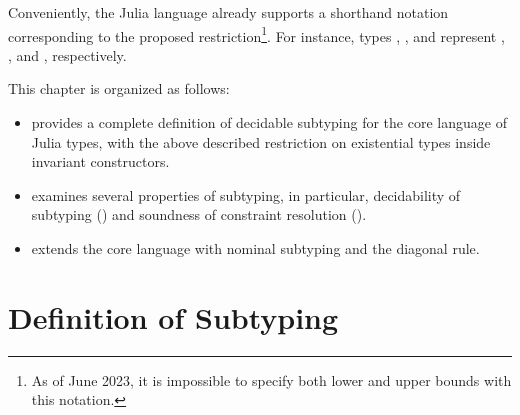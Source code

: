 Conveniently, the Julia language already supports a shorthand notation
corresponding to the proposed restriction\footnote{As of June 2023,
it is impossible to specify both lower and upper bounds with this notation.}.
For instance, types , , and 
represent , ,
and , respectively.

This chapter is organized as follows:
\begin{itemize}
    \item {} provides a complete definition
        of decidable subtyping for the core language of Julia types, 
        with the above described restriction
        on existential types inside invariant constructors.
    \item {} examines several properties
        of subtyping, in particular, decidability of subtyping
        () and
        soundness of constraint resolution ().
    \item {} extends the core language with 
        nominal subtyping and the diagonal rule.
\end{itemize}


\section{Definition of Subtyping}%
\label{sec:dec-sub:defs}


